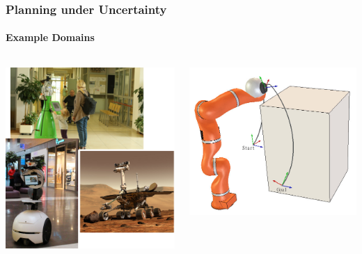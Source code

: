 \begin{frame}
	\frametitle{Planning under Uncertainty}
	\framesubtitle{Example Domains}
	
	\begin{columns}[t]
		\begin{column}{.3\textwidth}
			\centering 
			\begin{overlayarea}{\linewidth}{4.75cm}
				\includegraphics[width=\columnwidth]{figures/path-planning}
			\end{overlayarea}
		\end{column}
		\begin{column}{.3\textwidth}
			\centering
			\begin{overlayarea}{\linewidth}{4.75cm}
				\vspace{2pt}
				\includegraphics[width=\columnwidth]{figures/motion-planning}

\end{overlayarea}
\end{column}
\end{columns}
\end{frame}
